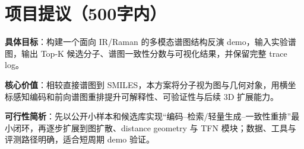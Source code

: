 \section{项目提议（500字内）}
\begin{keybox}
\textbf{具体目标}：构建一个面向 IR/Raman 的多模态谱图结构反演 demo，输入实验谱图，输出 Top-K 候选分子、谱图一致性分数与可视化结果，并保留完整 trace log。\par
\textbf{核心价值}：相较直接谱图到 SMILES，本方案将分子视为图与几何对象，用横坐标感知编码和前向谱图重排提升可解释性、可验证性与后续 3D 扩展能力。\par
\textbf{可行性简析}：先以公开小样本和候选库实现“编码--检索/轻量生成--一致性重排”最小闭环，再逐步扩展到图扩散、distance geometry 与 TFN 模块；数据、工具与评测路径明确，适合短周期 demo 验证。
\end{keybox}

